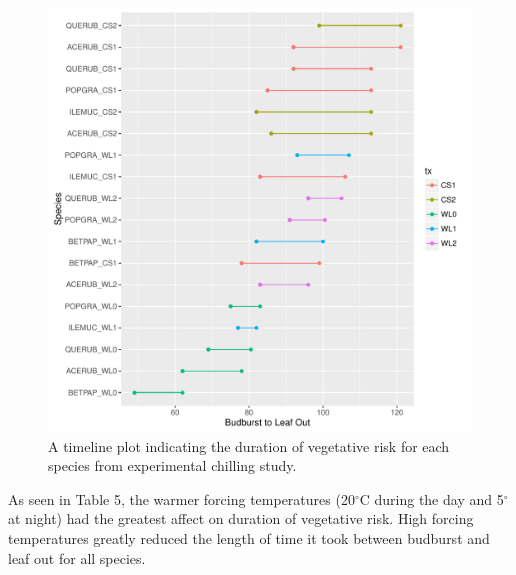 \documentclass{article}\usepackage[]{graphicx}\usepackage[]{color}
\makeatletter
\def\maxwidth{ %
  \ifdim\Gin@nat@width>\linewidth
    \linewidth
  \else
    \Gin@nat@width
  \fi
}
\makeatother
\begin{document}
\begin{figure}[H]
\includegraphics[width=\maxwidth]{figure/chilling-1} \caption[A timeline plot indicating the duration of vegetative risk for each species from experimental chilling study]{A timeline plot indicating the duration of vegetative risk for each species from experimental chilling study.}\label{fig:chilling}
\end{figure}



As seen in Table 5, the warmer forcing temperatures (20$^{\circ}$C during the day and 5$^{\circ}$ at night) had the greatest affect on duration of vegetative risk. High forcing temperatures greatly reduced the length of time it took between budburst and leaf out for all species. 
\end{document}
